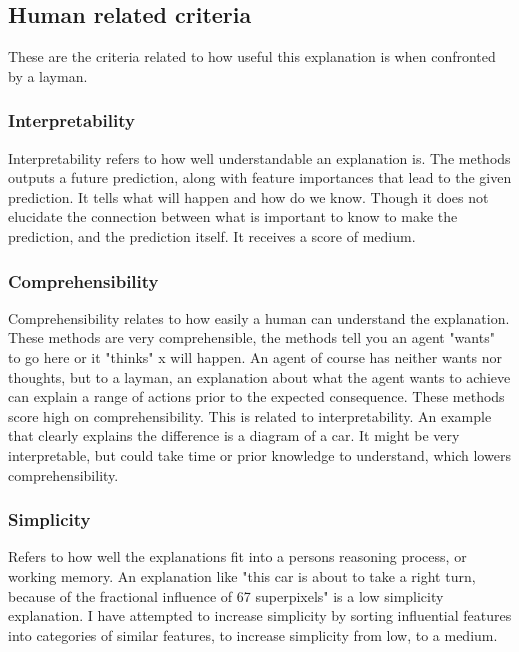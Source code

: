 \documentclass[UKenglish]{uiomasterthesis}
\begin{document}
\subsection{Human related criteria}
These are the criteria related to how useful this explanation is when confronted by a layman.

\subsubsection{Interpretability}
Interpretability refers to how well understandable an explanation is. The methods outputs a future prediction, along with feature importances that lead to the given prediction. It tells what will happen and how do we know. Though it does not elucidate the connection between what is important to know to make the prediction, and the prediction itself. It receives a score of medium.

\subsubsection{Comprehensibility}
Comprehensibility relates to how easily a human can understand the explanation. These methods are very comprehensible, the methods tell you an agent "wants" to go here or it "thinks" x will happen. An agent of course has neither wants nor thoughts, but to a layman, an explanation about what the agent wants to achieve can explain a range of actions prior to the expected consequence. These methods score high on comprehensibility. This is related to interpretability. An example that clearly explains the difference is a diagram of a car. It might be very interpretable, but could take time or prior knowledge to understand, which lowers comprehensibility.

\subsubsection{Simplicity}
Refers to how well the explanations fit into a persons reasoning process, or working memory. An explanation like "this car is about to take a right turn, because of the fractional influence of 67 superpixels" is a low simplicity explanation. I have attempted to increase simplicity by sorting influential features into categories of similar features, to increase simplicity from low, to a medium. 
\end{document}
